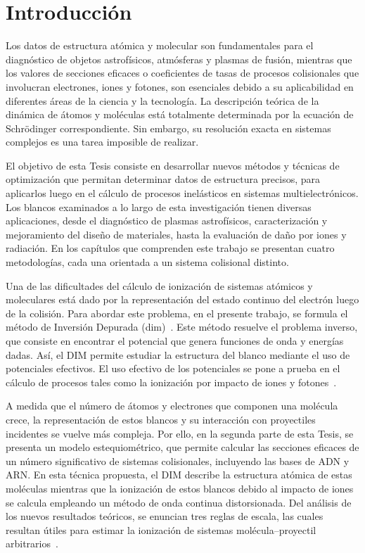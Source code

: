 \chapter*{Introducción}%
%

Los datos de estructura atómica y molecular son fundamentales para el 
diagnóstico de objetos astrofísicos, atmósferas y plasmas de fusión, 
mientras que los valores de secciones eficaces o coeficientes de tasas 
de procesos colisionales que involucran electrones, iones y fotones, son 
esenciales debido a su aplicabilidad en diferentes áreas de la ciencia y 
la tecnología. 
La descripción teórica de la dinámica de átomos y moléculas está 
totalmente determinada por la ecuación de Schr\"odinger correspondiente. 
Sin embargo, su resolución exacta en sistemas complejos es una tarea 
imposible de realizar. 

El objetivo de esta Tesis consiste en desarrollar nuevos métodos y 
técnicas de optimización que permitan determinar datos de estructura 
precisos, para aplicarlos luego en el cálculo de procesos inelásticos en 
sistemas multielectrónicos. Los blancos examinados a lo largo de esta 
investigación tienen diversas aplicaciones, desde el diagnóstico de 
plasmas astrofísicos, caracterización y mejoramiento del diseño de 
materiales, hasta la evaluación de daño por iones y radiación. En los 
capítulos que comprenden este trabajo se presentan cuatro metodologías, 
cada una orientada a un sistema colisional distinto. 

Una de las dificultades del cálculo de ionización de sistemas atómicos y
moleculares está dado por la representación del estado continuo del 
electrón luego de la colisión. Para abordar este problema, en el 
presente trabajo, se formula el método de Inversión Depurada 
(\acs{dim})~\cite{Mendez:16,Mendez:18,Mitnik:19}. Este método resuelve 
el problema inverso, que consiste en encontrar el potencial que genera 
funciones de onda y energías dadas. Así, el DIM permite estudiar la 
estructura del blanco mediante el uso de potenciales efectivos. El uso 
efectivo de los potenciales se pone a prueba en el cálculo de procesos 
tales como la ionización por impacto de iones y 
fotones~\cite{Mendez:19dim}. 

A medida que el número de átomos y electrones que componen una molécula 
crece, la representación de estos blancos y su interacción con 
proyectiles incidentes se vuelve más compleja. Por ello, en la segunda 
parte de esta Tesis, se presenta un modelo estequiométrico, que permite 
calcular las secciones eficaces de un número significativo de sistemas 
colisionales, incluyendo las bases de ADN y ARN. En esta técnica 
propuesta, el DIM describe la estructura atómica de estas moléculas 
mientras que la ionización de estos blancos debido al impacto de iones 
se calcula empleando un método de onda continua distorsionada. 
Del análisis de los nuevos resultados teóricos, se enuncian tres reglas 
de escala, las cuales resultan útiles para estimar la ionización de 
sistemas molécula--proyectil arbitrarios~\cite{Mendez:20scale}. 

